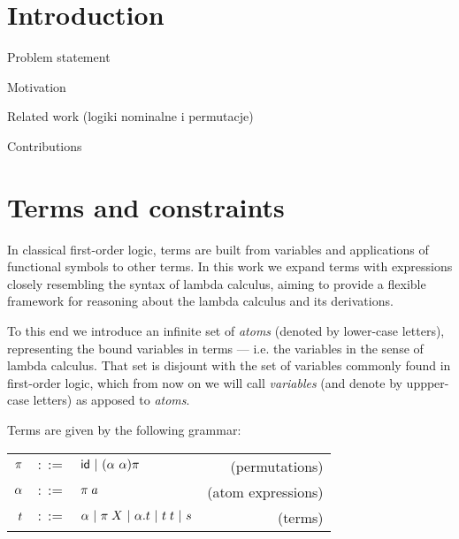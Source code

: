 \documentclass[english, mgr]{iithesis}
\author         {Dominik Gulczyński}
\date           {\today}                     %
\begin{document}
\chapter{Introduction}

Problem statement

Motivation

Related work (logiki nominalne i permutacje)


Contributions


\chapter{Terms and constraints}

In classical first-order logic, terms are built from variables and
applications of functional symbols to other terms.
In this work we expand terms with expressions closely resembling the syntax
of lambda calculus, aiming to provide a flexible framework for reasoning about
the lambda calculus and its derivations.

To this end we introduce an infinite set of \textit{atoms}
(denoted by lower-case letters), representing the bound variables in terms
--- i.e. the variables in the sense of lambda calculus.
That set is disjount with the set of variables commonly found in first-order logic,
which from now on we will call \textit{variables} (and denote by uppper-case letters)
as apposed to \textit{atoms}.

Terms are given by the following grammar: \\
\begin{tabular}{rclr}
    $\pi$    & $::=$ & $\mathsf{id}
                   \ |\  (\alpha\ \alpha) \pi$
        & (permutations) \\
    $\alpha$ & $::=$ & $\pi \; a$
        & (atom expressions) \\
    $t$    & $::=$ & $\alpha
                   \ |\  \pi \; X
                   \ |\  \alpha. t
                   \ |\  t \; t
                   \ |\  s$
        & (terms)
\end{tabular}
\end{document}
